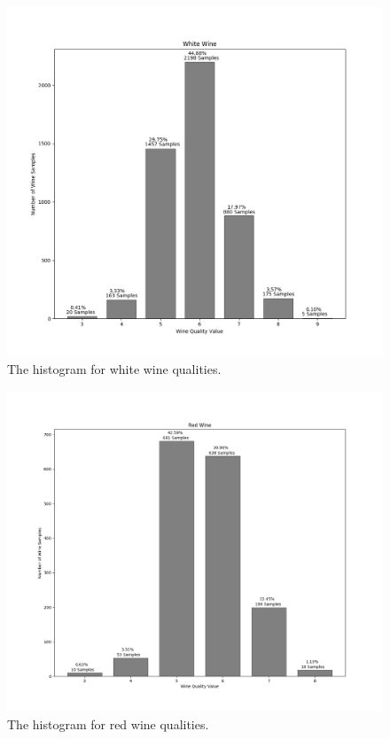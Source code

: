 \documentclass[10pt,twocolumn,letterpaper]{article}
\begin{document}
\begin{figure}[h]
	\begin{center}
		\includegraphics[width=0.9\linewidth]{img/white_samples.png}
	\end{center}
	\caption{The histogram for white wine qualities.}
	\label{fig:hist}
\end{figure}

\begin{figure}[h]
	\begin{center}
		\includegraphics[width=0.9\linewidth]{img/red_samples.png}
	\end{center}
	\caption{The histogram for red wine qualities.}
	\label{fig:histr}
\end{figure}
\end{document}
